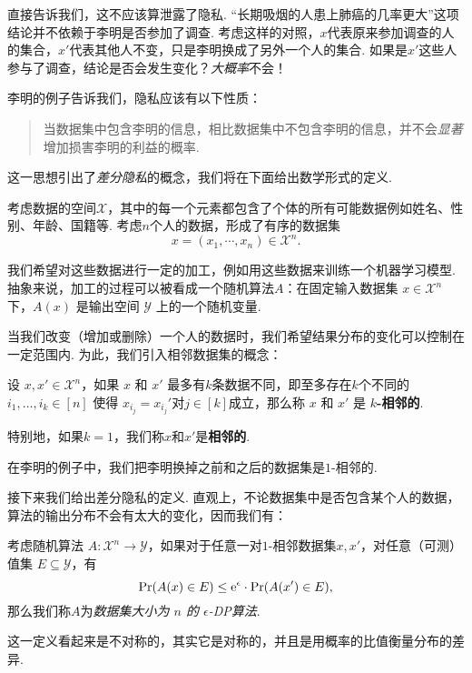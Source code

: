 直接告诉我们，这不应该算泄露了隐私. “长期吸烟的人患上肺癌的几率更大”这项结论并不依赖于李明是否参加了调查. 考虑这样的对照，$x$代表原来参加调查的人的集合，$x'$代表其他人不变，只是李明换成了另外一个人的集合. 如果是$x'$这些人参与了调查，结论是否会发生变化？\textit{大概率}不会！

李明的例子告诉我们，隐私应该有以下性质：
\begin{quotation}
    当数据集中包含李明的信息，相比数据集中不包含李明的信息，并不会\textit{显著}增加损害李明的利益的概率.
\end{quotation}
这一思想引出了\textit{差分隐私}的概念，我们将在下面给出数学形式的定义.

考虑数据的空间$\mathcal X$，其中的每一个元素都包含了个体的所有可能数据例如姓名、性别、年龄、国籍等. 考虑$n$个人的数据，形成了有序的数据集
\[x = (x_1, \cdots, x_n) \in \mathcal X^n.\]  

我们希望对这些数据进行一定的加工，例如用这些数据来训练一个机器学习模型. 抽象来说，加工的过程可以被看成一个随机算法$A$：在固定输入数据集 $x \in \mathcal X^n$下，$A(x)$ 是输出空间 $\mathcal Y$ 上的一个随机变量. 

当我们改变（增加或删除）一个人的数据时，我们希望结果分布的变化可以控制在一定范围内. 为此，我们引入相邻数据集的概念：

\begin{definition}[$k$-相邻数据集]
    设 $x, x' \in \mathcal X^n$，如果 $x$ 和 $x'$ 最多有$k$条数据不同，即至多存在$k$个不同的$i_1,\dots,i_k \in [n]$ 使得 $x_{i_j}=x_{i_j}'$对$j\in[k]$成立，那么称 $x$ 和 $x'$ 是 \textbf{$k$-相邻的}. 
    
    特别地，如果$k=1$，我们称$x$和$x'$是\textbf{相邻的}.
\end{definition}

在李明的例子中，我们把李明换掉之前和之后的数据集是$1$-相邻的. 

接下来我们给出差分隐私的定义. 直观上，不论数据集中是否包含某个人的数据，算法的输出分布不会有太大的变化，因而我们有：

\begin{definition}
考虑随机算法 $A : \mathcal X^n \to \mathcal Y$，如果对于任意一对$1$-相邻数据集$x, x'$，对任意（可测）值集 $E \subseteq \mathcal Y$，有
\[
\Pr(A(x)\in E) \leq \mathrm{e}^{\epsilon} \cdot \Pr(A(x')\in E),
\]
那么我们称$A$为\textit{数据集大小为 $n$ 的 $\epsilon$-DP算法}.
\end{definition}

这一定义看起来是不对称的，其实它是对称的，并且是用概率的比值衡量分布的差异. 

